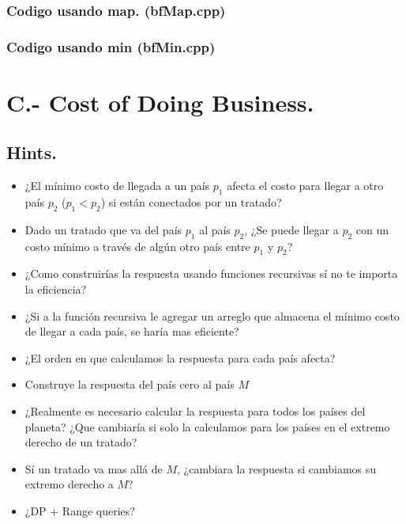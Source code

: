\documentclass[12pt,letterpaper,titlepage]{article}
\begin{document}
	\subsubsection{Codigo usando map. (bfMap.cpp)}
	
	\subsubsection{Codigo usando min (bfMin.cpp)}
	
\clearpage
\section{C.- Cost of Doing Business.}
\subsection{Hints.}
\begin{itemize}
	\item ¿El mínimo costo de llegada a un país $p_{1}$ afecta el costo para llegar a otro país $p_{2}$ ($p_{1} < p_{2}$) si están conectados por un tratado?
	\item Dado un tratado que va del país $p_{1}$ al país $p_{2}$, ¿Se puede llegar a $p_{2}$ con un costo mínimo a través de algún otro país entre $p_{1}$ y $p_{2}$?
	\item ¿Como construirías la respuesta usando funciones recursivas sí no te importa la eficiencia?
	\item ¿Si a la función recursiva le agregar un arreglo que almacena el mínimo costo de llegar a cada país, se haría mas eficiente?
	\item ¿El orden en que calculamos la respuesta para cada país afecta?
	\item Construye la respuesta del país cero al país $M$
	\item ¿Realmente es necesario calcular la respuesta para todos los países del planeta? ¿Que cambiaría si solo la calculamos para los países en el extremo derecho de un tratado?
	\item Sí un tratado va mas allá de $M$, ¿cambiara la respuesta si cambiamos su extremo derecho a $M$?
	\item ¿DP + Range queries?
\end{itemize}
\end{document}
